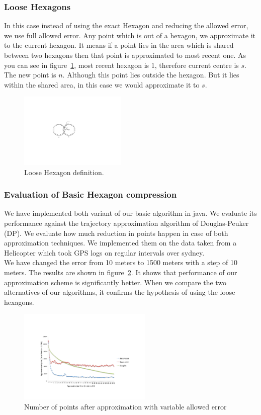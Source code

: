 \documentclass[conference]{IEEEtran}
\begin{document}
\subsubsection{Loose Hexagons}
In this case instead of using the exact Hexagon and reducing the allowed error, we use full allowed error. Any 
point which is out of a hexagon, we approximate it to the current hexagon. It means if a point lies in the area which 
is shared between two hexagons then that point is approximated to most recent one. As you can see in 
figure~\ref{fig:loose-hexagon}, most recent hexagon is 1, therefore current centre is $s$. The new point is $n$. 
Although this point lies outside the hexagon. But it lies within the shared area, in this case we would approximate it to $s$.

\begin{figure}[ht]
  \centering
  \includegraphics[width=2in]{images/loose-hexagon-shared.pdf}
  \caption {Loose Hexagon definition.}
  \label{fig:loose-hexagon}
\end{figure}

\subsubsection{Evaluation of Basic Hexagon compression}
We have implemented both variant of our basic algorithm in java. We evaluate its performance against the trajectory 
approximation algorithm of Douglas-Peuker (DP). We evaluate how much reduction in points happen in case of both 
approximation techniques. We implemented them on the data taken from a Helicopter which took GPS logs on regular 
intervals over sydney.\\
We have changed the error from 10 meters to 1500 meters with a step of 10 meters. The results are shown in 
figure~\ref{fig:performance-graph}. It shows that performance of our approximation scheme is significantly better. 
When we compare the two alternatives of our algorithms, it confirms the hypothesis of using the loose hexagons.


\begin{figure}[ht]
  \centering
  \includegraphics[width=2.5in]{images/basic-points.pdf}
  \caption {Number of points after approximation with variable allowed error}
  \label{fig:performance-graph}
\end{figure}
\end{document}
